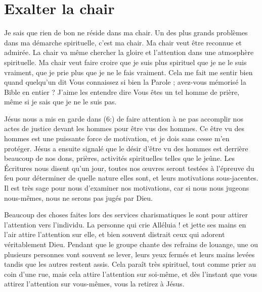 \section{Exalter la chair}

Je sais que rien de bon ne réside dans ma chair.
 Un des plus grands problèmes dans ma démarche spirituelle, c'est ma chair.
 Ma chair veut être reconnue et admirée. La chair va même chercher
 la gloire et l'attention dans une atmosphère spirituelle.
 Ma chair veut faire croire que je suis plus spirituel que je ne le suis
 vraiment, que je prie plus que je ne le fais vraiment.
 Cela me fait me sentir bien quand quelqu'un dit\frcolon{}
 \Og Vous connaissez si bien la Parole ; avez-vous mémorisé la Bible
 en entier ? \Fg{} J'aime les entendre dire\frcolon{}
 \Og Vous êtes un tel homme de prière, \Fg{} même si je sais
 que je ne le suis pas.

Jésus nous a mis en garde dans (6:) de faire attention
 à ne pas accomplir nos actes de justice devant les hommes
 pour être vus des hommes. Ce \Og être vu des hommes \Fg{} est une
 puissante force de motivation, et je dois sans cesse m'en protéger.
 Jésus a ensuite signalé que le désir d'être vu des hommes
 est derrière beaucoup de nos dons, prières, activités spirituelles
 telles que le jeûne. Les Écritures nous disent qu'un jour,
 toutes nos œuvres seront testées à l'épreuve du feu pour déterminer
 de quelle nature elles sont, et leurs motivations sous-jacentes.
 Il est très sage pour nous d'examiner nos motivations,
 car si nous nous jugeons nous-mêmes, nous ne serons pas jugés par Dieu.

Beaucoup des choses faites lors des services charismatiques
 le sont pour attirer l'attention vers l'individu.
 La personne qui crie \Og Alléluia ! \Fg{} et jette ses mains en l'air
 attire l'attention sur elle, et bien souvent distrait ceux qui adorent
 véritablement Dieu. Pendant que le groupe chante des refrains de louange,
 une ou plusieurs personnes vont souvent se lever, leurs yeux fermés
 et leurs mains levées tandis que les autres restent assis.
 Cela paraît très spirituel, tout comme prier au coin d'une rue,
 mais cela attire l'attention sur soi-même, et dès l'instant
 que vous attirez l'attention sur vous-mêmes, vous la retirez à Jésus.

